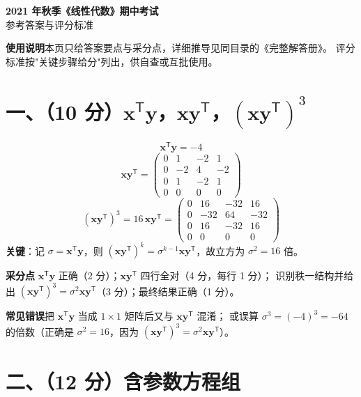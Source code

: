\documentclass[11pt]{ctexart}
\newcommand{\TT}{^{\mathsf T}}
\newcommand{\bv}[1]{\begin{pmatrix}#1\end{pmatrix}}
\begin{document}
\begin{center}
{\Large\bfseries 2021 年秋季《线性代数》期中考试}\\[3pt]
{\large 参考答案与评分标准}
\end{center}

\vspace{0.1cm}
\begin{ansbox}
\textbf{使用说明}\quad 本页只给答案要点与采分点，详细推导见同目录的《完整解答册》。
评分标准按"关键步骤给分"列出，供自查或互批使用。
\end{ansbox}

\vspace{0.2cm}

\section*{一、（10 分）$\mathbf x\TT\mathbf y$，$\mathbf x\mathbf y\TT$，$(\mathbf x\mathbf y\TT)^3$}

\begin{ansbox}
\[
\mathbf x\TT\mathbf y=-4
\]
\[
\mathbf x\mathbf y\TT=\bv{0&1&-2&1\\0&-2&4&-2\\0&1&-2&1\\0&0&0&0}
\]
\[
(\mathbf x\mathbf y\TT)^3=16\,\mathbf x\mathbf y\TT=\bv{0&16&-32&16\\0&-32&64&-32\\0&16&-32&16\\0&0&0&0}
\]
\textbf{关键}：记 $\sigma=\mathbf x\TT\mathbf y$，则 $(\mathbf x\mathbf y\TT)^k=\sigma^{k-1}\mathbf x\mathbf y\TT$，故立方为 $\sigma^2=16$ 倍。
\end{ansbox}

\begin{scorebox}
\textbf{采分点}\quad
$\mathbf x\TT\mathbf y$ 正确（2 分）；$\mathbf x\mathbf y\TT$ 四行全对（4 分，每行 1 分）；
识别秩一结构并给出 $(\mathbf x\mathbf y\TT)^3=\sigma^2\mathbf x\mathbf y\TT$（3 分）；最终结果正确（1 分）。

\textbf{常见错误}\quad 把 $\mathbf x\TT\mathbf y$ 当成 $1\times1$ 矩阵后又与 $\mathbf x\mathbf y\TT$ 混淆；
或误算 $\sigma^3=(-4)^3=-64$ 的倍数（正确是 $\sigma^2=16$，因为 $(\mathbf x\mathbf y\TT)^3=\sigma^2\mathbf x\mathbf y\TT$）。
\end{scorebox}

\section*{二、（12 分）含参数方程组}
\end{document}
